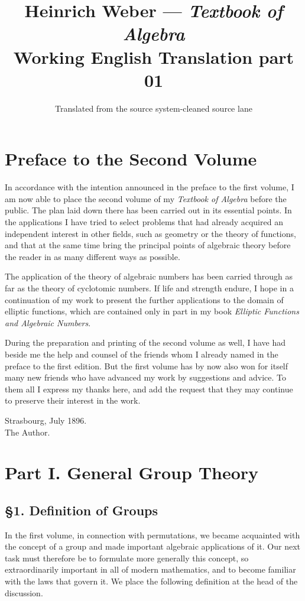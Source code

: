 \documentclass[12pt,a4paper]{book}
\title{Heinrich Weber --- \textit{Textbook of Algebra}\\Working English Translation part 01}
\author{Translated from the source system-cleaned source lane}
\date{}
\begin{document}
\maketitle
\chapter*{Preface to the Second Volume}
In accordance with the intention announced in the preface to the first volume, I am now able to place the second volume of my \emph{Textbook of Algebra} before the public. The plan laid down there has been carried out in its essential points. In the applications I have tried to select problems that had already acquired an independent interest in other fields, such as geometry or the theory of functions, and that at the same time bring the principal points of algebraic theory before the reader in as many different ways as possible.

The application of the theory of algebraic numbers has been carried through as far as the theory of cyclotomic numbers. If life and strength endure, I hope in a continuation of my work to present the further applications to the domain of elliptic functions, which are contained only in part in my book \emph{Elliptic Functions and Algebraic Numbers}.

During the preparation and printing of the second volume as well, I have had beside me the help and counsel of the friends whom I already named in the preface to the first edition. But the first volume has by now also won for itself many new friends who have advanced my work by suggestions and advice. To them all I express my thanks here, and add the request that they may continue to preserve their interest in the work.

\begin{flushright}
Strasbourg, July 1896.\\
The Author.
\end{flushright}

\chapter*{Part I. General Group Theory}
\section*{\S 1. Definition of Groups}
In the first volume, in connection with permutations, we became acquainted with the concept of a group and made important algebraic applications of it. Our next task must therefore be to formulate more generally this concept, so extraordinarily important in all of modern mathematics, and to become familiar with the laws that govern it. We place the following definition at the head of the discussion.
\end{document}
